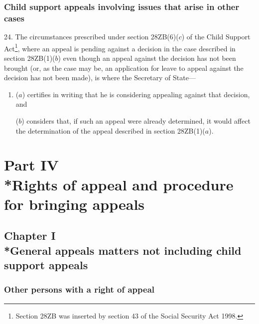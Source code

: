 \documentclass[12pt,a4paper]{article}
\begin{document}

\subsubsection[24. Child support appeals involving issues that arise in other cases]{Child support appeals involving issues that arise in other cases}

24.  The circumstances prescribed under section 28ZB(6)($c$) of the Child Support Act\footnote{\frenchspacing Section 28ZB was inserted by section 43 of the Social Security Act 1998.}, where an appeal is pending against a decision in the case described in section 28ZB(1)($b$) even though an appeal against the decision has not been brought (or, as the case may be, an application for leave to appeal against the decision has not been made), is where the Secretary of State—
\begin{enumerate}\item[]
($a$) certifies in writing that he is considering appealing against that decision, and

($b$) considers that, if such an appeal were already determined, it would affect the determination of the appeal described in section 28ZB(1)($a$).
\end{enumerate}

\section[Part IV --- Rights of appeal and procedure for bringing appeals]{\sloppy{} Part IV\\*Rights of appeal and procedure for bringing appeals}

\subsection[Chapter I --- General appeals matters not including child support appeals]{Chapter I\\*General appeals matters not including child support appeals}

\renewcommand\parthead{--- Part IV Chapter I}

\subsubsection[25. Other persons with a right of appeal]{Other persons with a right of appeal}
\end{document}
